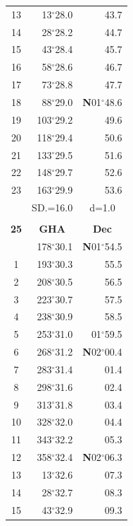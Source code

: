 \documentclass[10pt, a4paper]{report}
\begin{document}
\begin{scriptsize}
\begin{tabular*}{0.2\textwidth}[t]{@{\extracolsep{\fill}}|c|rr|}
13 & 13$^\circ$28.0 & 43.7\\
14 & 28$^\circ$28.2 & 44.7\\
15 & 43$^\circ$28.4 & \raisebox{0.24ex}{\boldmath$\cdot$~\boldmath$\cdot$~~}45.7\\
16 & 58$^\circ$28.6 & 46.7\\
17 & 73$^\circ$28.8 & 47.7\\[2Pt]
18 & 88$^\circ$29.0 & \textbf{N}01$^\circ$48.6\\
19 & 103$^\circ$29.2 & 49.6\\
20 & 118$^\circ$29.4 & 50.6\\
21 & 133$^\circ$29.5 & \raisebox{0.24ex}{\boldmath$\cdot$~\boldmath$\cdot$~~}51.6\\
22 & 148$^\circ$29.7 & 52.6\\
23 & 163$^\circ$29.9 & 53.6\\
\hline
\rule{0pt}{2.4ex} & \multicolumn{1}{c}{SD.=16.0} & \multicolumn{1}{c|}{d=1.0}\\
\hline
\multicolumn{1}{c}{}\\[-0.5ex]\hline
\multicolumn{1}{|c|}{\rule{0pt}{2.6ex}\textbf{25}} & \multicolumn{1}{c}{\textbf{GHA}} & \multicolumn{1}{c|}{\textbf{Dec}}\\
\hline\rule{0pt}{2.6ex}\noindent
0 & 178$^\circ$30.1 & \textbf{N}01$^\circ$54.5\\
1 & 193$^\circ$30.3 & 55.5\\
2 & 208$^\circ$30.5 & 56.5\\
3 & 223$^\circ$30.7 & \raisebox{0.24ex}{\boldmath$\cdot$~\boldmath$\cdot$~~}57.5\\
4 & 238$^\circ$30.9 & 58.5\\
5 & 253$^\circ$31.0 & 01$^\circ$59.5\\[2Pt]
6 & 268$^\circ$31.2 & \textbf{N}02$^\circ$00.4\\
7 & 283$^\circ$31.4 & 01.4\\
8 & 298$^\circ$31.6 & 02.4\\
9 & 313$^\circ$31.8 & \raisebox{0.24ex}{\boldmath$\cdot$~\boldmath$\cdot$~~}03.4\\
10 & 328$^\circ$32.0 & 04.4\\
11 & 343$^\circ$32.2 & 05.3\\[2Pt]
12 & 358$^\circ$32.4 & \textbf{N}02$^\circ$06.3\\
13 & 13$^\circ$32.6 & 07.3\\
14 & 28$^\circ$32.7 & 08.3\\
15 & 43$^\circ$32.9 & \raisebox{0.24ex}{\boldmath$\cdot$~\boldmath$\cdot$~~}09.3\\

\end{tabular*}
\end{scriptsize}
\end{document}
